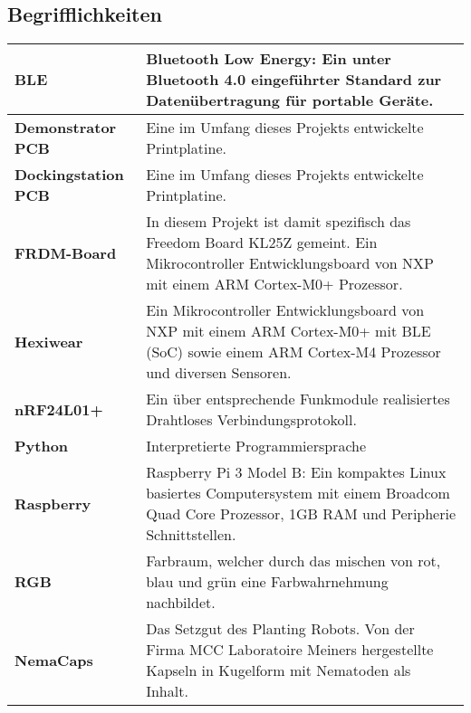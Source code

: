 \begin{sffamily}
\subsection*{Begrifflichkeiten}
\begin{table}[H]
	
	\begin{tabular}{|L{4.5cm}|L{11cm}|}
		\hline
		\textbf{BLE} & Bluetooth Low Energy: Ein unter Bluetooth 4.0 eingeführter Standard zur Datenübertragung für portable Geräte.\\
		
		\hline		
		\textbf{Demonstrator PCB} & Eine im Umfang dieses Projekts entwickelte Printplatine.\\
		
		\hline		
		\textbf{Dockingstation PCB} & Eine im Umfang dieses Projekts entwickelte Printplatine.\\
		
		\hline		
		\textbf{FRDM-Board} & In diesem Projekt ist damit spezifisch das Freedom Board KL25Z gemeint. Ein Mikrocontroller Entwicklungsboard von NXP mit einem ARM Cortex-M0+ Prozessor. \\
		
		\hline
		\textbf{Hexiwear} & Ein Mikrocontroller Entwicklungsboard von NXP mit einem ARM Cortex-M0+ mit BLE (SoC) sowie einem ARM Cortex-M4 Prozessor und diversen Sensoren.\\
		
		\hline
		\textbf{nRF24L01+} & Ein über entsprechende Funkmodule realisiertes Drahtloses Verbindungsprotokoll.\\	
			
		\hline
		\textbf{Python} & Interpretierte Programmiersprache \\
		
		\hline		
		\textbf{Raspberry} & Raspberry Pi 3 Model B: Ein kompaktes Linux basiertes Computersystem mit einem Broadcom Quad Core Prozessor, 1GB RAM und Peripherie Schnittstellen. \\	
		
		\hline
		\textbf{RGB} &  Farbraum, welcher durch das mischen von rot, blau und grün eine Farbwahrnehmung nachbildet. \\
		
		\hline
		\textbf{NemaCaps} &  Das Setzgut des Planting Robots. Von der Firma MCC Laboratoire Meiners hergestellte Kapseln in Kugelform mit Nematoden als Inhalt. \\
		
		\hline
	\end{tabular} 
	\vspace{0.2cm}
\end{table}


\end{sffamily}